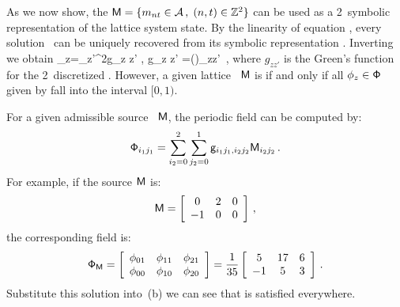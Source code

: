 

As we now show, the
{\brick}
\(
\mathsf{M}= \{{m_{nt}} \in \mathcal{A} \,,\; (n,t)\in \mathbb{Z}^2 \}
\)
can be used as a 2\dmn\ symbolic representation of the lattice system
state.
By the linearity of equation , every solution \Xx\
can be uniquely recovered from its symbolic representation \Mm. Inverting
\refeq{2dCoupledCats} we obtain
\beq
  \ssp_{z}=\sum_{z'\in\integers^2}g_{z z'} , \qquad  g_{z z' }
       =\left(\frac{1}{-\Box +2(s -2)}\right)_{zz'}
       \,,
where  $g_{z z'}$
is the  Green's
function for the 2\dmn\ discretized \sPe.
However, a given lattice \brick\ $\Mm$ %
is \emph{{\admissible}} if and only if all  $\ssp_{z}\in \Xx$ given by
\refeq{GreenFuncCoupled} fall into the interval $[0,1)$.

For a given
admissible source \brick\ $\Mm$, the periodic field can be computed by:
\[
\Xx_{i_1 j_1} =
\sum_{i_2=0}^2 \sum_{j_2=0}^1 \gd_{i_1 j_1,i_2 j_2} \Mm_{i_2 j_2} \, .
\]
For example, if the source $\mathsf{M}$ is:
\[
\mathsf{M} =
 \left[
 \begin{array}{ccc}
 0 & 2 & 0 \\
 -1 & 0 & 0
 \end{array}
 \right] \, ,
\]
the corresponding field is:
\[
\mathsf{\Phi}_{\mathsf{M}} =
 \left[
 \begin{array}{ccc}
 \phi_{01} & \phi_{11} & \phi_{21} \\
 \phi_{00} & \phi_{10} & \phi_{20}
 \end{array}
 \right]
 =
 \frac{1}{35}
 \left[
 \begin{array}{ccc}
 5 & 17 & 6 \\
 -1 & 5 & 3
 \end{array}
 \right] \, .
\]
Substitute this solution into \,(b) we
can see that  is satisfied everywhere.

\subsection{{\Tzeta}}
\label{s:catLattZeta}


